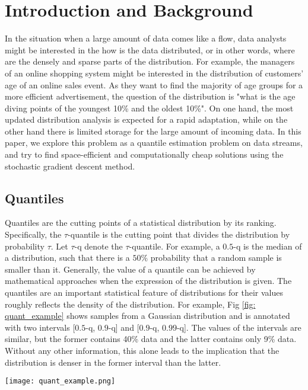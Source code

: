 \chapter{Introduction and Background}
\label{ch: intro}

\graphicspath{{Figures/Intro/}{./}} 

In the situation when a large amount of data comes like a flow, data analysts might be interested in the how is the data distributed, or in other words, where are the densely and sparse parts of the distribution. For example, the managers of an online shopping system might be interested in the distribution of customers' age of an online sales event. As they want to find the majority of age groups for a more efficient advertisement, the question of the distribution is "what is the age diving points of the youngest 10\% and the oldest 10\%".  On one hand, the most updated distribution analysis is expected for a rapid adaptation, while on the other hand there is limited storage for the large amount of incoming data. In this paper, we explore this problem as a quantile estimation problem on data streams, and try to find space-efficient and computationally cheap solutions using the stochastic gradient descent method.

\section{Quantiles}
\label{sec: intro_quant}
Quantiles are the cutting points of a statistical distribution by its ranking. Specifically, the $\tau$-quantile is the cutting point that divides the distribution by probability $\tau$. Let $\tau$-q denote the $\tau$-quantile. For example, a $0.5$-q is the median of a distribution, such that there is a $50\%$ probability that a random sample is smaller than it. Generally, the value of a quantile can be achieved by mathematical approaches when the expression of the distribution is given. 
The quantiles are an important statistical feature of distributions for their values roughly reflects the density of the distribution.
For example, Fig \ref{fig: quant_example} shows samples from a Gaussian distribution and is annotated with two intervals [$0.5$-q, $0.9$-q] and [$0.9$-q, $0.99$-q]. The values of the intervals are similar, but the former contains 40\% data and the latter contains only 9\% data. Without any other information, this alone leads to the implication that the distribution is denser in the former interval than the latter.

\begin{figure*}[h!]
    \centering
	\texttt{[image: quant\_example.png]}
    \caption{Quantiles (0.5-q, 0.9-q and 0.99-q) of a dataset containing 2000 random samples from a Gaussian distribution (mean = 2, standard deviation = 18)}
    \label{fig: quant_example}
\end{figure*}

